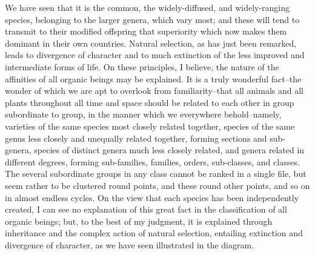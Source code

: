 We have seen that it is the common, the widely-diffused, and widely-ranging species, belonging to the larger genera, which vary most; and these will tend to transmit to their modified offspring that superiority which now makes them dominant in their own countries. Natural selection, as has just been remarked, leads to divergence of character and to much extinction of the less improved and intermediate forms of life. On these principles, I believe, the nature of the affinities of all organic beings may be explained. It is a truly wonderful fact--the wonder of which we are apt to overlook from familiarity--that all animals and all plants throughout all time and space should be related to each other in group subordinate to group, in the manner which we everywhere behold--namely, varieties of the same species most closely related together, species of the same genus less closely and unequally related together, forming sections and sub-genera, species of distinct genera much less closely related, and genera related in different degrees, forming sub-families, families, orders, sub-classes, and classes. The several subordinate groups in any class cannot be ranked in a single file, but seem rather to be clustered round points, and these round other points, and so on in almost endless cycles. On the view that each species has been independently created, I can see no explanation of this great fact in the classification of all organic beings; but, to the best of my judgment, it is explained through inheritance and the complex action of natural selection, entailing extinction and divergence of character, as we have seen illustrated in the diagram.
